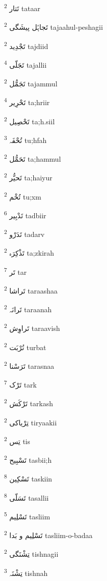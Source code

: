 \documentclass[12pt]{article}
\begin{document}
\begin{RTL}
\begin{multicols}{5}
{\ur تَتار}   \textsuperscript{2} tataar

{\ur تَجاہُل پیشَگی}   \textsuperscript{2} tajaahul-peshagii

{\ur تَجْدِید}   \textsuperscript{2} tajdiid

{\ur تَجَلّی}   \textsuperscript{4} tajallii

{\ur تَجَمُّل}   \textsuperscript{2} tajammul

{\ur تَحْرِیر}   \textsuperscript{4} ta;hriir

{\ur تَحْصِیل}   \textsuperscript{2} ta;h.siil

{\ur تُحْفَہ}   \textsuperscript{3} tu;hfah

{\ur تَحَمُّل}   \textsuperscript{2} ta;hammul

{\ur تَحیُّر}   \textsuperscript{2} ta;haiyur

{\ur تُخْم}   \textsuperscript{2} tu;xm

{\ur تَدْبِیر}   \textsuperscript{6} tadbiir

{\ur تَدَرْو}   \textsuperscript{2} tadarv

{\ur تَذْکِرَہ}   \textsuperscript{2} ta;zkirah

{\ur تَر}   \textsuperscript{7} tar

{\ur تَراشا}   \textsuperscript{2} taraashaa

{\ur تَرانَہ}   \textsuperscript{2} taraanah

{\ur تَراوِش}   \textsuperscript{2} taraavish

{\ur تُرْبَت}   \textsuperscript{2} turbat

{\ur تَرَسْنا}   \textsuperscript{2} tarasnaa

{\ur تَرْک}   \textsuperscript{7} tark

{\ur تَرْکَش}   \textsuperscript{2} tarkash

{\ur تِرْیاکی}   \textsuperscript{2} tiryaakii

{\ur تِس}   \textsuperscript{2} tis

{\ur تَسْبِیح}   \textsuperscript{2} tasbii;h

{\ur تَسْکِین}   \textsuperscript{8} taskiin

{\ur تَسَلّی}   \textsuperscript{8} tasallii

{\ur تَسْلِیم}   \textsuperscript{5} tasliim

{\ur تَسْلِیم و بَدا}   \textsuperscript{2} tasliim-o-badaa

{\ur تِشْنَگی}   \textsuperscript{2} tishnagii

{\ur تِشْنَہ}   \textsuperscript{3} tishnah


\end{multicols}
\end{RTL}
\end{document}

